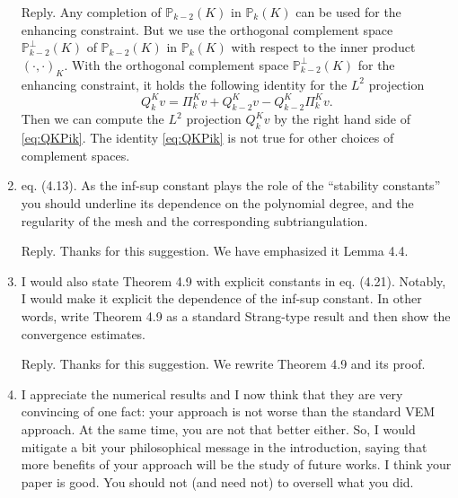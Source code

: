 \documentclass[10pt]{amsart}
\theoremstyle{definition}
\theoremstyle{remark}
\begin{document}
\begin{enumerate}[1.]
\smallskip \noindent \textcolor[rgb]{1.00,0.00,0.00}{Reply.}
Any completion of $\mathbb P_{k-2}(K)$ in $\mathbb P_{k}(K)$ can be used for the enhancing constraint.
But we use the orthogonal complement space $\mathbb P_{k-2}^{\perp}(K)$ of $\mathbb P_{k-2}(K)$ in $\mathbb P_{k}(K)$ with respect to the inner product $(\cdot, \cdot)_K$.
With the orthogonal complement space $\mathbb P_{k-2}^{\perp}(K)$ for the enhancing constraint, it holds the following identity for the $L^2$ projection
\begin{equation}\label{eq:QKPik}  
Q_k^Kv= \Pi_k^Kv + Q_{k-2}^Kv-Q_{k-2}^K\Pi_k^Kv.
\end{equation}
Then we can compute the $L^2$ projection $Q_k^Kv$ by the right hand side of \eqref{eq:QKPik}.
The identity \eqref{eq:QKPik} is not true for other choices of complement spaces.



\medskip

\item \textsf{eq. (4.13). As the inf-sup constant plays the role of the ``stability constants'' you should underline its dependence on the polynomial degree, and the regularity of the mesh and the corresponding subtriangulation.}

\smallskip \noindent \textcolor[rgb]{1.00,0.00,0.00}{Reply.}
Thanks for this suggestion. We have emphasized it Lemma 4.4.


\medskip

\item \textsf{I would also state Theorem 4.9 with explicit constants in eq. (4.21). Notably, I would make it explicit the dependence of the inf-sup constant. In other words, write Theorem 4.9 as a standard Strang-type result and then show the convergence estimates.}

\smallskip \noindent \textcolor[rgb]{1.00,0.00,0.00}{Reply.}
Thanks for this suggestion. We rewrite Theorem 4.9 and its proof.



\medskip

\item \textsf{I appreciate the numerical results and I now think that they are very convincing of one fact: your approach is not worse than the standard VEM approach. At the same time, you are not that better either. So, I would mitigate a bit your philosophical message in the introduction, saying that more benefits of your approach will be the study of future works. I think your paper is good. You should not (and need not) to oversell what you did.}


\end{enumerate}
\end{document}
